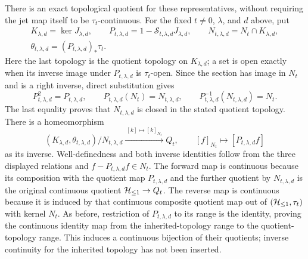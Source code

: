 There is an exact topological quotient for these representatives,
without requiring the jet map itself to be $\tau_t$-continuous.
For the fixed $t\ne0$, $\lambda$, and $d$ above, put
\begin{gather*}
 K_{\lambda,d}=\ker J_{\lambda,d},\qquad
 P_{t,\lambda,d}=1-\mathcal S_{t,\lambda,d}J_{\lambda,d},\qquad
 N_{t,\lambda,d}=N_t\cap K_{\lambda,d},\\
 \theta_{t,\lambda,d}=(P_{t,\lambda,d})_*\tau_t.
\end{gather*}
Here the last topology is the quotient topology on
$K_{\lambda,d}$; a set is open exactly when its inverse
image under $P_{t,\lambda,d}$ is $\tau_t$-open.
Since the section has image in $N_t$ and is a right inverse,
direct substitution gives
\[
 P_{t,\lambda,d}^2=P_{t,\lambda,d},\qquad
 P_{t,\lambda,d}(N_t)=N_{t,\lambda,d},\qquad
 P_{t,\lambda,d}^{-1}(N_{t,\lambda,d})=N_t.
\]
The last equality proves that $N_{t,\lambda,d}$ is closed
in the stated quotient topology. There is a homeomorphism
\begin{equation}
 (K_{\lambda,d},\theta_{t,\lambda,d})/N_{t,\lambda,d}
  \xrightarrow{\ [k]\mapsto[k]_{N_t}\ }Q_t,
 \qquad
 [f]_{N_t}\longmapsto[P_{t,\lambda,d}f]
 \label{eq:cq-moving-jet-source-quotient}
\end{equation}
as its inverse. Well-definedness and both inverse identities
follow from the three displayed relations and
$f-P_{t,\lambda,d}f\in N_t$. The forward map is continuous
because its composition with the quotient map
$P_{t,\lambda,d}$ and the further quotient by
$N_{t,\lambda,d}$ is the original continuous quotient
$\mathcal H_{\leq 1}\to Q_t$. The reverse map is continuous because
it is induced by that continuous composite quotient map
out of $(\mathcal H_{\leq 1},\tau_t)$ with kernel $N_t$.
As before, restriction of $P_{t,\lambda,d}$ to its range
is the identity, proving the continuous identity map from
the inherited-topology range to the quotient-topology
range. This induces a continuous bijection of their
quotients; inverse continuity for the inherited topology
has not been inserted.

